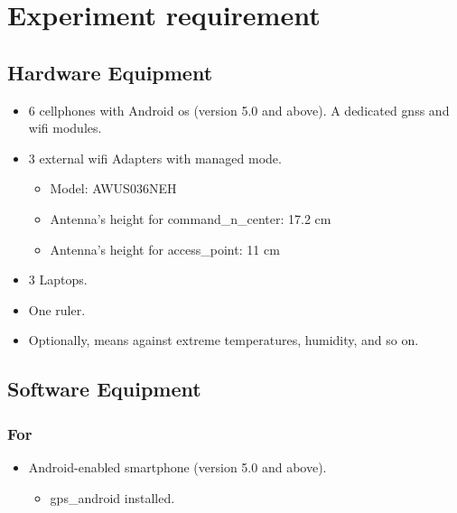 \section{Experiment requirement}\label{experiment-requirement}

\subsection{Hardware Equipment}\label{hardware-equipment}

\begin{itemize}
\tightlist
\item
  6 cellphones with Android \acrshort{os} (version 5.0 and above). A dedicated \gls{gnss}
  and \gls{wifi} modules.
\item
  3 external \gls{wifi} Adapters with managed mode.

  \begin{itemize}
  \tightlist
  \item
    Model: AWUS036NEH
  \item
    Antenna's height for \gls{command_n_center}: 17.2 cm
  \item
    Antenna's height for \gls{access_point}: 11 cm
  \end{itemize}
\item
  3 Laptops.
\item
  One ruler.
\item
  Optionally, means against extreme temperatures, humidity, and so on.
\end{itemize}

\subsection{Software Equipment}\label{software-equipment}

\subsubsection{For  }

\begin{itemize}
\tightlist
\item
  Android-enabled smartphone (version 5.0 and above).

  \begin{itemize}
  \tightlist
  \item
  	\Gls{gps_android} installed.
    \end{itemize}
\end{itemize}

